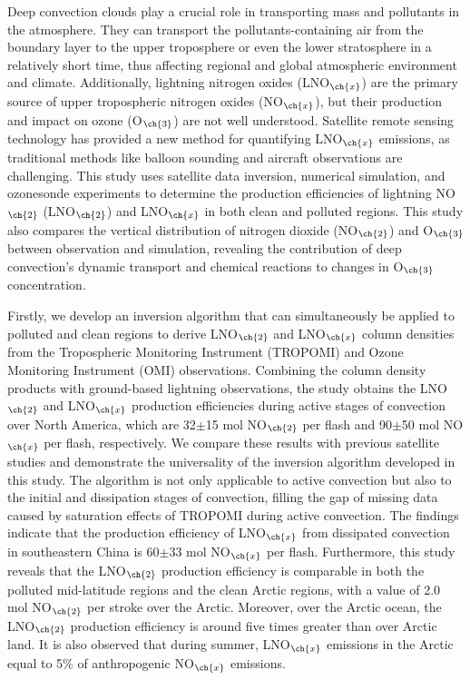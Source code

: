 {
Deep convection clouds play a crucial role in transporting mass and pollutants in the atmosphere.
They can transport the pollutants-containing air from the boundary layer to the upper troposphere or even the lower stratosphere in a relatively short time, thus affecting regional and global atmospheric environment and climate.
Additionally, lightning nitrogen oxides (LNO$_{\ch{x}}$) are the primary source of upper tropospheric nitrogen oxides (NO$_{\ch{x}}$),
but their production and impact on ozone (O$_{\ch{3}}$) are not well understood.
Satellite remote sensing technology has provided a new method for quantifying LNO$_{\ch{x}}$ emissions, as traditional methods like balloon sounding and aircraft observations are challenging.
This study uses satellite data inversion, numerical simulation, and ozonesonde experiments to determine the production efficiencies of lightning NO$_{\ch{2}}$ (LNO$_{\ch{2}}$) and LNO$_{\ch{x}}$ in both clean and polluted regions.
This study also compares the vertical distribution of nitrogen dioxide (NO$_{\ch{2}}$) and O$_{\ch{3}}$ between observation and simulation,  revealing the contribution of deep convection's dynamic transport and chemical reactions to changes in O$_{\ch{3}}$ concentration.

Firstly, we develop an inversion algorithm that can simultaneously be applied to polluted and clean regions to derive LNO$_{\ch{2}}$ and LNO$_{\ch{x}}$ column densities from the Tropospheric Monitoring Instrument (TROPOMI) and Ozone Monitoring Instrument (OMI) observations.
Combining the column density products with ground-based lightning observations, the study obtains the LNO$_{\ch{2}}$ and LNO$_{\ch{x}}$ production efficiencies during active stages of convection over North America, which are 32$\pm$15 mol NO$_{\ch{2}}$ per flash and 90$\pm$50 mol NO$_{\ch{x}}$ per flash, respectively.
We compare these results with previous satellite studies and demonstrate the universality of the inversion algorithm developed in this study.
The algorithm is not only applicable to active convection but also to the initial and dissipation stages of convection, filling the gap of missing data caused by saturation effects of TROPOMI during active convection.
The findings indicate that the production efficiency of LNO$_{\ch{x}}$ from dissipated convection in southeastern China is 60$\pm$33 mol NO$_{\ch{x}}$ per flash.
Furthermore, this study reveals that the LNO$_{\ch{2}}$ production efficiency is comparable in both the polluted mid-latitude regions and the clean Arctic regions, with a value of 2.0 mol NO$_{\ch{2}}$ per stroke over the Arctic.
Moreover, over the Arctic ocean, the LNO$_{\ch{2}}$ production efficiency is around five times greater than over Arctic land.
It is also observed that during summer, LNO$_{\ch{x}}$ emissions in the Arctic equal to 5\% of anthropogenic NO$_{\ch{x}}$ emissions.

}
